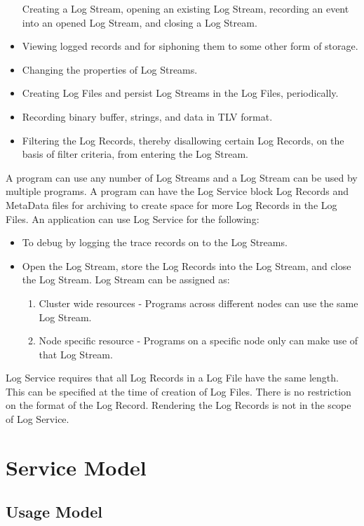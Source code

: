 \begin{flushleft}
\begin{itemize}
Creating a Log Stream, opening an existing Log Stream, recording an event into an opened Log Stream, and closing a Log Stream. 
\item
Viewing logged records and for siphoning them to some other form of storage.
\item
Changing the properties of Log Streams.
\item
Creating Log Files and persist Log Streams in the Log Files, periodically.
\item
Recording binary buffer, strings, and data in TLV format. 
\item
Filtering the Log Records, thereby disallowing certain Log Records, on the basis of filter criteria, from entering the Log Stream.
\end{itemize}

\par
A program can use any number of Log Streams and a Log Stream can be used by multiple programs. 
A program can have the Log Service block Log Records and MetaData files for archiving to create space for more Log Records in the Log Files. 
An application can use Log Service for the following:
\begin{itemize}
\item
To debug by logging the trace records on to the Log Streams.
\item
Open the Log Stream, store the Log Records into the Log Stream, and close the Log Stream. 
Log Stream can be assigned as: 
\begin{enumerate}
\item Cluster wide resources - Programs across different nodes can use the same Log Stream. 
\item Node specific resource - Programs on a specific node only can make use of that Log Stream. 
\end{enumerate}
\end{itemize}

\par
Log Service requires that all Log Records in a Log File have the same length. This can be specified at the time of creation of Log Files. 
There is no restriction on the format of the Log Record. 
Rendering the Log Records is not in the scope of Log Service. 



\chapter{Service Model}
\section{Usage Model}


\end{flushleft}
